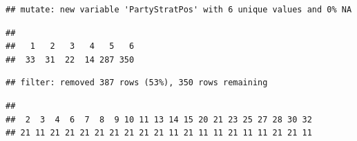 \documentclass[]{article}
\newenvironment{Shaded}{\begin{snugshade}}{\end{snugshade}}
\newcommand{\CommentTok}[1]{\textcolor[rgb]{0.56,0.35,0.01}{\textit{#1}}}
\newcommand{\DataTypeTok}[1]{\textcolor[rgb]{0.13,0.29,0.53}{#1}}
\newcommand{\DecValTok}[1]{\textcolor[rgb]{0.00,0.00,0.81}{#1}}
\newcommand{\KeywordTok}[1]{\textcolor[rgb]{0.13,0.29,0.53}{\textbf{#1}}}
\newcommand{\NormalTok}[1]{#1}
\newcommand{\OperatorTok}[1]{\textcolor[rgb]{0.81,0.36,0.00}{\textbf{#1}}}
\newcommand{\StringTok}[1]{\textcolor[rgb]{0.31,0.60,0.02}{#1}}
\begin{document}
\begin{verbatim}
## mutate: new variable 'PartyStratPos' with 6 unique values and 0% NA
\end{verbatim}

\begin{Shaded}
\end{Shaded}

\begin{verbatim}
## 
##   1   2   3   4   5   6 
##  33  31  22  14 287 350
\end{verbatim}

\begin{Shaded}
\end{Shaded}

\begin{verbatim}
## filter: removed 387 rows (53%), 350 rows remaining
\end{verbatim}

\begin{Shaded}
\end{Shaded}

\begin{verbatim}
## 
##  2  3  4  6  7  8  9 10 11 13 14 15 20 21 23 25 27 28 30 32 
## 21 11 21 21 21 21 21 21 21 21 11 21 11 11 21 11 11 21 21 11
\end{verbatim}

\begin{Shaded}
\end{Shaded}
\end{document}
